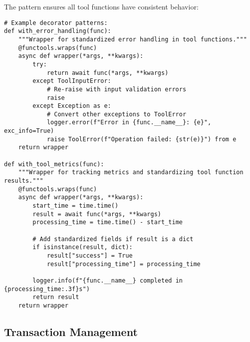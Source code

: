 \documentclass[12pt,a4paper]{article}
\begin{document}
The pattern ensures all tool functions have consistent behavior:
\begin{pageablecode}
\begin{verbatim}
# Example decorator patterns:
def with_error_handling(func):
    """Wrapper for standardized error handling in tool functions."""
    @functools.wraps(func)
    async def wrapper(*args, **kwargs):
        try:
            return await func(*args, **kwargs)
        except ToolInputError:
            # Re-raise with input validation errors
            raise
        except Exception as e:
            # Convert other exceptions to ToolError
            logger.error(f"Error in {func.__name__}: {e}", exc_info=True)
            raise ToolError(f"Operation failed: {str(e)}") from e
    return wrapper

def with_tool_metrics(func):
    """Wrapper for tracking metrics and standardizing tool function results."""
    @functools.wraps(func)
    async def wrapper(*args, **kwargs):
        start_time = time.time()
        result = await func(*args, **kwargs)
        processing_time = time.time() - start_time

        # Add standardized fields if result is a dict
        if isinstance(result, dict):
            result["success"] = True
            result["processing_time"] = processing_time

        logger.info(f"{func.__name__} completed in {processing_time:.3f}s")
        return result
    return wrapper
\end{verbatim}
\end{pageablecode}

\subsection*{Transaction Management}
\end{document}
